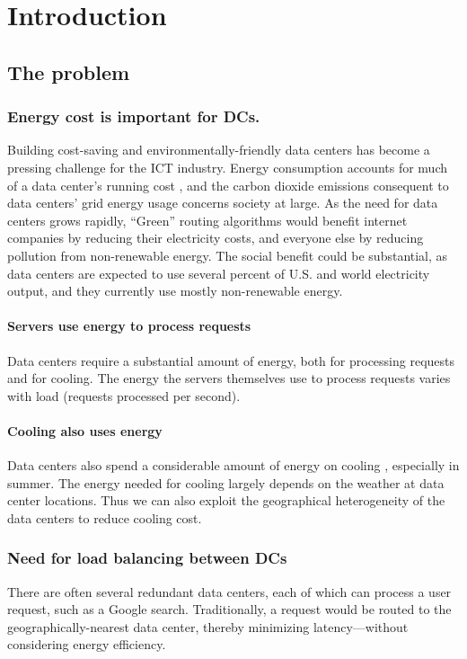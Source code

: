 \documentclass{acm_proc_article-sp}
\begin{document}
\section{Introduction}


\subsection{The problem}
	\subsubsection{Energy cost is important for DCs.}
		Building cost-saving and environmentally-friendly data centers has become a pressing challenge for the ICT industry.
		Energy consumption accounts for much of a data center’s running cost \cite{datacenter}, and the carbon dioxide emissions consequent to data centers’ grid energy usage concerns society at large.
		As the need for data centers grows rapidly,
		“Green” routing algorithms would benefit internet companies by reducing their electricity costs, and everyone else by reducing pollution from non-renewable energy. The social benefit could be substantial, as data centers are expected to use several percent of U.S. and world electricity output, and they currently use mostly non-renewable energy.
		
		\paragraph{Servers use energy to process requests}
			Data centers require a substantial amount of energy, both for processing requests and for cooling. The energy the servers themselves use to process requests varies with load (requests processed per second).
		\paragraph{Cooling also uses energy}
			Data centers also spend a considerable amount of energy on cooling \cite{datacenter}, especially in summer. The energy needed for cooling largely depends on the weather at data center locations. Thus we can also exploit the geographical heterogeneity of the data centers to reduce cooling cost.
	\subsubsection{Need for load balancing between DCs}
		There are often several redundant data centers, each of which can process a user request, such as a Google search. Traditionally, a request would be routed to the geographically-nearest data center, thereby minimizing latency—without considering energy efficiency.
\end{document}
